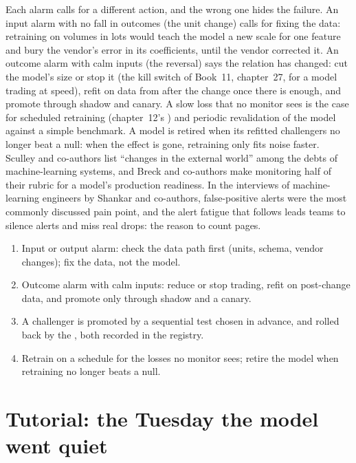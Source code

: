 Each alarm calls for a different action, and the wrong one hides the failure. An input alarm with no fall in outcomes (the unit
change) calls for fixing the data: retraining on volumes in lots would teach the model a new scale for one feature and bury the
vendor's error in its coefficients, until the vendor corrected it. An outcome alarm with calm inputs (the reversal) says the
relation has changed: cut the model's size or stop it (the kill switch of Book~11, chapter~27, for a model trading at speed),
refit on data from after the change once there is enough, and promote through shadow and canary. A slow loss that no monitor
sees is the case for scheduled retraining (chapter~12's ) and periodic revalidation of the model against a
simple benchmark. A model is retired when its refitted challengers no longer beat a null: when the effect is gone, retraining
only fits noise faster. Sculley and co-authors list ``changes in the external world'' among the debts of machine-learning
systems, and Breck and co-authors make monitoring half of their rubric for a model's production readiness. In the interviews
of machine-learning engineers by Shankar and co-authors, false-positive alerts were the most commonly discussed pain point, and
the alert fatigue that follows leads teams to silence alerts and miss real drops: the reason to count pages.

\begin{method}\label{met:ml:mon:after}
\begin{enumerate}
\item Input or output alarm: check the data path first (units, schema, vendor changes); fix the data, not the model.
\item Outcome alarm with calm inputs: reduce or stop trading, refit on post-change data, and promote only through shadow and a
canary.
\item A challenger is promoted by a sequential test chosen in advance, and rolled back by the , both recorded in
the registry.
\item Retrain on a schedule for the losses no monitor sees; retire the model when retraining no longer beats a null.
\end{enumerate}
\end{method}

\section{Tutorial: the Tuesday the model went quiet}\label{tut:ml:monitoring-and-retraining:tut}

